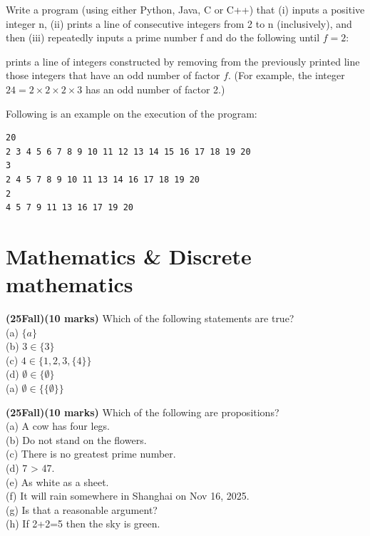 \documentclass{article}
\begin{document}
\vspace{2\baselineskip}

\noindent Write a program (using either Python, Java, C or C++) that (i) inputs a positive integer n, (ii) prints a line of consecutive integers from 2 to n (inclusively), and then (iii) repeatedly inputs a prime number f and do the following until $f = 2$:

prints a line of integers constructed by removing from the previously printed line those integers that have an odd number of factor $f$. (For example, the integer $24 = 2 \times 2 \times 2 \times 3$ has an odd number of factor 2.)

Following is an example on the execution of the program:
\begin{lstlisting}
20 
2 3 4 5 6 7 8 9 10 11 12 13 14 15 16 17 18 19 20 
3 
2 4 5 7 8 9 10 11 13 14 16 17 18 19 20 
2 
4 5 7 9 11 13 16 17 19 20 
\end{lstlisting}

\vspace{1\baselineskip}





\section{Mathematics \& Discrete mathematics}

\noindent \textbf{(25Fall)(10 marks)} Which of the following statements are true? \\
\indent (a) $\{a\}$ \\ 
\indent (b) ${3 \in \{3\}}$ \\
\indent (c) ${4 \in \{1, 2, 3, \{4\}\} }$ \\
\indent (d) ${\emptyset \in \{\emptyset\}}$ \\
\indent (a) ${\emptyset \in {\{\{\emptyset\}\}}}$ \\



\vspace{2\baselineskip}

\noindent \textbf{(25Fall)(10 marks)} Which of the following are propositions? \\
\indent (a) A cow has four legs.\\
\indent (b) Do not stand on the flowers.\\
\indent (c) There is no greatest prime number.\\
\indent (d) 7 > 47.\\
\indent (e) As white as a sheet.\\
\indent (f) It will rain somewhere in Shanghai on Nov 16, 2025.\\
\indent (g) Is that a reasonable argument?\\
\indent (h) If 2+2=5 then the sky is green.\\
\end{document}
